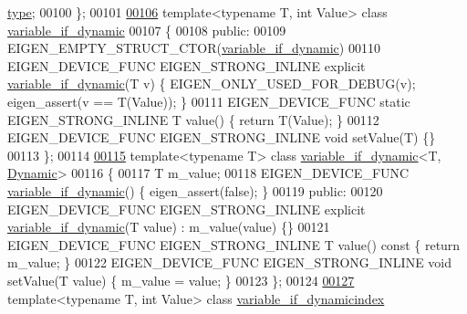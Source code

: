 \begin{DoxyCode}
       \hyperlink{struct_eigen_1_1internal_1_1conditional}{type};
00100 \};
00101 
\hyperlink{class_eigen_1_1internal_1_1variable__if__dynamic}{00106} \textcolor{keyword}{template}<\textcolor{keyword}{typename} T, \textcolor{keywordtype}{int} Value> \textcolor{keyword}{class }\hyperlink{class_eigen_1_1internal_1_1variable__if__dynamic}{variable\_if\_dynamic}
00107 \{
00108   \textcolor{keyword}{public}:
00109     EIGEN\_EMPTY\_STRUCT\_CTOR(\hyperlink{class_eigen_1_1internal_1_1variable__if__dynamic}{variable\_if\_dynamic})
00110     EIGEN\_DEVICE\_FUNC EIGEN\_STRONG\_INLINE \textcolor{keyword}{explicit} \hyperlink{class_eigen_1_1internal_1_1variable__if__dynamic}{variable\_if\_dynamic}(T v) \{ 
      EIGEN\_ONLY\_USED\_FOR\_DEBUG(v); eigen\_assert(v == T(Value)); \}
00111     EIGEN\_DEVICE\_FUNC \textcolor{keyword}{static} EIGEN\_STRONG\_INLINE T value() \{ \textcolor{keywordflow}{return} T(Value); \}
00112     EIGEN\_DEVICE\_FUNC EIGEN\_STRONG\_INLINE \textcolor{keywordtype}{void} setValue(T) \{\}
00113 \};
00114 
\hyperlink{class_eigen_1_1internal_1_1variable__if__dynamic_3_01_t_00_01_dynamic_01_4}{00115} \textcolor{keyword}{template}<\textcolor{keyword}{typename} T> \textcolor{keyword}{class }\hyperlink{class_eigen_1_1internal_1_1variable__if__dynamic}{variable\_if\_dynamic}<T, \hyperlink{namespace_eigen_ad81fa7195215a0ce30017dfac309f0b2}{Dynamic}>
00116 \{
00117     T m\_value;
00118     EIGEN\_DEVICE\_FUNC \hyperlink{class_eigen_1_1internal_1_1variable__if__dynamic}{variable\_if\_dynamic}() \{ eigen\_assert(\textcolor{keyword}{false}); \}
00119   \textcolor{keyword}{public}:
00120     EIGEN\_DEVICE\_FUNC EIGEN\_STRONG\_INLINE \textcolor{keyword}{explicit} \hyperlink{class_eigen_1_1internal_1_1variable__if__dynamic}{variable\_if\_dynamic}(T value) : 
      m\_value(value) \{\}
00121     EIGEN\_DEVICE\_FUNC EIGEN\_STRONG\_INLINE T value()\textcolor{keyword}{ const }\{ \textcolor{keywordflow}{return} m\_value; \}
00122     EIGEN\_DEVICE\_FUNC EIGEN\_STRONG\_INLINE \textcolor{keywordtype}{void} setValue(T value) \{ m\_value = value; \}
00123 \};
00124 
\hyperlink{class_eigen_1_1internal_1_1variable__if__dynamicindex}{00127} \textcolor{keyword}{template}<\textcolor{keyword}{typename} T, \textcolor{keywordtype}{int} Value> \textcolor{keyword}{class }\hyperlink{class_eigen_1_1internal_1_1variable__if__dynamicindex}{variable\_if\_dynamicindex}

\end{DoxyCode}
